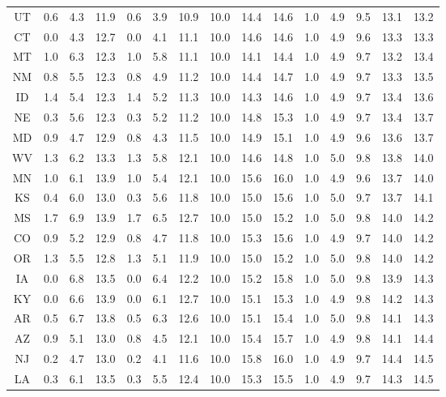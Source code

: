 \documentclass[nips13submit_09,times,art10]{article} %
\begin{document}
\begin{table}[ht]
\begin{tabular}{|c|rrr|rrr|rrr|rrrrr|}
  UT & 0.6 & 4.3 & 11.9 & 0.6 & 3.9 & 10.9 & 10.0 & 14.4 & 14.6 & 1.0 & 4.9 & 9.5 & 13.1 & 13.2 \\
  CT & 0.0 & 4.3 & 12.7 & 0.0 & 4.1 & 11.1 & 10.0 & 14.6 & 14.6 & 1.0 & 4.9 & 9.6 & 13.3 & 13.3 \\
  MT & 1.0 & 6.3 & 12.3 & 1.0 & 5.8 & 11.1 & 10.0 & 14.1 & 14.4 & 1.0 & 4.9 & 9.7 & 13.2 & 13.4 \\
  NM & 0.8 & 5.5 & 12.3 & 0.8 & 4.9 & 11.2 & 10.0 & 14.4 & 14.7 & 1.0 & 4.9 & 9.7 & 13.3 & 13.5 \\
  ID & 1.4 & 5.4 & 12.3 & 1.4 & 5.2 & 11.3 & 10.0 & 14.3 & 14.6 & 1.0 & 4.9 & 9.7 & 13.4 & 13.6 \\
  NE & 0.3 & 5.6 & 12.3 & 0.3 & 5.2 & 11.2 & 10.0 & 14.8 & 15.3 & 1.0 & 4.9 & 9.7 & 13.4 & 13.7 \\
  MD & 0.9 & 4.7 & 12.9 & 0.8 & 4.3 & 11.5 & 10.0 & 14.9 & 15.1 & 1.0 & 4.9 & 9.6 & 13.6 & 13.7 \\
  WV & 1.3 & 6.2 & 13.3 & 1.3 & 5.8 & 12.1 & 10.0 & 14.6 & 14.8 & 1.0 & 5.0 & 9.8 & 13.8 & 14.0 \\
  MN & 1.0 & 6.1 & 13.9 & 1.0 & 5.4 & 12.1 & 10.0 & 15.6 & 16.0 & 1.0 & 4.9 & 9.6 & 13.7 & 14.0 \\
  KS & 0.4 & 6.0 & 13.0 & 0.3 & 5.6 & 11.8 & 10.0 & 15.0 & 15.6 & 1.0 & 5.0 & 9.7 & 13.7 & 14.1 \\
  MS & 1.7 & 6.9 & 13.9 & 1.7 & 6.5 & 12.7 & 10.0 & 15.0 & 15.2 & 1.0 & 5.0 & 9.8 & 14.0 & 14.2 \\
  CO & 0.9 & 5.2 & 12.9 & 0.8 & 4.7 & 11.8 & 10.0 & 15.3 & 15.6 & 1.0 & 4.9 & 9.7 & 14.0 & 14.2 \\
  OR & 1.3 & 5.5 & 12.8 & 1.3 & 5.1 & 11.9 & 10.0 & 15.0 & 15.2 & 1.0 & 5.0 & 9.8 & 14.0 & 14.2 \\
  IA & 0.0 & 6.8 & 13.5 & 0.0 & 6.4 & 12.2 & 10.0 & 15.2 & 15.8 & 1.0 & 5.0 & 9.8 & 13.9 & 14.3 \\
  KY & 0.0 & 6.6 & 13.9 & 0.0 & 6.1 & 12.7 & 10.0 & 15.1 & 15.3 & 1.0 & 4.9 & 9.8 & 14.2 & 14.3 \\
  AR & 0.5 & 6.7 & 13.8 & 0.5 & 6.3 & 12.6 & 10.0 & 15.1 & 15.4 & 1.0 & 5.0 & 9.8 & 14.1 & 14.3 \\
  AZ & 0.9 & 5.1 & 13.0 & 0.8 & 4.5 & 12.1 & 10.0 & 15.4 & 15.7 & 1.0 & 4.9 & 9.8 & 14.1 & 14.4 \\
  NJ & 0.2 & 4.7 & 13.0 & 0.2 & 4.1 & 11.6 & 10.0 & 15.8 & 16.0 & 1.0 & 4.9 & 9.7 & 14.4 & 14.5 \\
  LA & 0.3 & 6.1 & 13.5 & 0.3 & 5.5 & 12.4 & 10.0 & 15.3 & 15.5 & 1.0 & 4.9 & 9.7 & 14.3 & 14.5 \\

\end{tabular}
\end{table}
\end{document}
